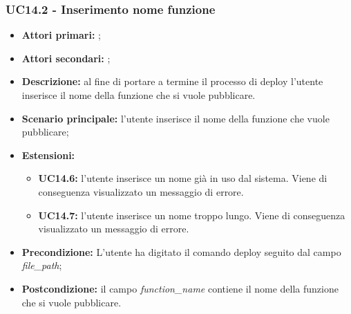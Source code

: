 \subsubsection{UC14.2 - Inserimento nome funzione}
\begin{itemize}
	\item \textbf{Attori primari:} \us{};
	\item \textbf{Attori secondari:} \re{};
	\item \textbf{Descrizione:} al fine di portare a termine il processo di deploy l’utente inserisce il nome della funzione che si vuole pubblicare.  
	\item \textbf{Scenario principale:} l'utente inserisce il nome della funzione che vuole pubblicare;
	\item \textbf{Estensioni:} 
	\begin{itemize}
		\item \textbf{UC14.6:} l’utente inserisce un nome già in uso dal sistema. Viene di conseguenza visualizzato un messaggio di errore. 
		\item \textbf{UC14.7:} l’utente inserisce un nome troppo lungo. Viene di conseguenza visualizzato un messaggio di errore. 
	\end{itemize}
	\item \textbf{Precondizione:} L’utente ha digitato il comando deploy seguito dal campo \textit{file\_path};
	\item \textbf{Postcondizione:} il campo \textit{function\_name} contiene il nome della funzione che si vuole pubblicare.
\end{itemize}